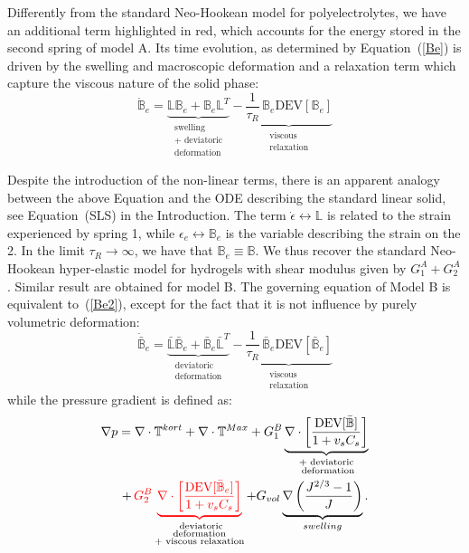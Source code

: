 \documentclass[runningheads]{llncs}
\newcommand{\LL}{\ensuremath{\mathbb{L}}}
\begin{document}
Differently from the standard Neo-Hookean model for polyelectrolytes, we have an additional term highlighted in red, which accounts for the energy stored in the second spring of model A. Its time evolution, as determined by Equation~(\ref{Be}) is driven by the swelling and macroscopic deformation and a relaxation term which capture the viscous nature of the solid phase:
\begin{equation}
\dot{\mathbb{B}}_e=\underbrace{\LL\mathbb{B}_e + \mathbb{B}_e \LL^T}_{\substack{\text{swelling}\\\text{+ deviatoric}\\\text{deformation}}} - \underbrace{\frac{1}{\tau_R} \,\mathbb{B}_e\text{DEV}[\mathbb{B}_e]}_{\substack{\text{viscous}\\\text{relaxation}}}\label{Be2}
\end{equation}


Despite the introduction of the non-linear terms, there is an apparent analogy between the above Equation and the ODE describing the standard linear solid, see Equation~(SLS) in the Introduction. The term $\dot{\epsilon} \leftrightarrow \LL$ is related to the strain experienced by spring 1, while $\epsilon_e  \leftrightarrow \mathbb{B}_e$ is the variable describing the strain on the 2. In the limit $\tau_R\rightarrow \infty$, we have that $\mathbb{B}_e\equiv\mathbb{B}$. We thus recover the standard Neo-Hookean hyper-elastic model for hydrogels with shear modulus given by $G^A_1+G^A_2$. Similar result are obtained for model B. The governing equation of Model B is equivalent to~(\ref{Be2}), except for the fact that it is not influence by purely volumetric deformation:
\begin{equation}
\dot{\bar{\mathbb{B}}}_e=\underbrace{\bar{\LL}\bar{\mathbb{B}}_e + \bar{\mathbb{B}}_e \bar{\LL}^T}_{\substack{\text{deviatoric}\\\text{deformation}}} - \underbrace{\frac{1}{\tau_R} \,\bar{\mathbb{B}}_e\text{DEV}[\bar{\mathbb{B}}_e]}_{\substack{\text{viscous}\\\text{relaxation}}}
\end{equation}
while the pressure gradient is defined as:
\begin{equation}
\begin{aligned}
\nabla p= \nabla \cdot \mathbb{T}^{kort} + \nabla \cdot \mathbb{T}^{Max} + G_1^B\underbrace{ \nabla \cdot \left[\frac{\text{DEV}[\bar{\mathbb{B}}]}{1+v_sC_s}\right]}_{\substack{\text{+ deviatoric}\\\text{ deformation}}} \\
+ \,\color{red} G_2^B \underbrace{\nabla \cdot\left[\frac{\text{DEV}[\bar{\mathbb{B}}_e]}{1+v_sC_s}\right]}_{\color{black}\substack{\text{ deviatoric}\\\text{deformation}\\\text{+ viscous relaxation}}}\color{black}+ G_{vol}\underbrace{\nabla \left(\frac{J^{2/3}-1}{J}\right)}_{swelling}.
\end{aligned}
\end{equation}
\end{document}
